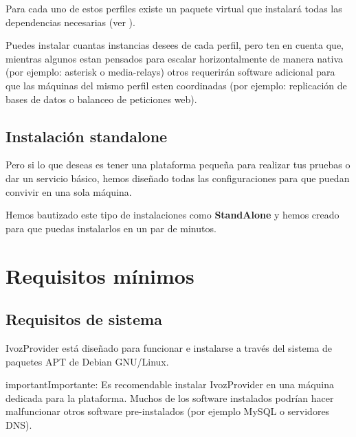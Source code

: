 \documentclass[letterpaper,10pt,spanish]{sphinxmanual}
\begin{document}
Para cada uno de estos perfiles existe un paquete virtual que instalará todas las dependencias necesarias (ver {\hyperref[installation/debian_install:installing\string-profile\string-package]{}}).

Puedes instalar cuantas instancias desees de cada perfil, pero ten en cuenta que, mientras algunos estan pensados para escalar horizontalmente de manera nativa (por ejemplo: asterisk o media-relays) otros requerirán software adicional para que las máquinas del mismo perfil esten coordinadas (por ejemplo: replicación de bases de datos o balanceo de peticiones web).


\subsection{Instalación standalone}
\label{installation/install_types:standalone-install}
Pero si lo que deseas es tener una plataforma pequeña para realizar tus pruebas o dar un servicio básico, hemos diseñado todas las configuraciones para que puedan convivir en una sola máquina.

Hemos bautizado este tipo de instalaciones como \textbf{StandAlone} y hemos  creado {\hyperref[installation/cd_install:automatic\string-iso\string-cd\string-image]{}} para que puedas instalarlos en un par de minutos.


\section{Requisitos mínimos}
\label{installation/requirements:minimum-requirements}\label{installation/requirements::doc}

\subsection{Requisitos de sistema}
\label{installation/requirements:system-requirements}
IvozProvider está diseñado para funcionar e instalarse a través del sistema de paquetes APT de Debian GNU/Linux.

\begin{notice}{important}{Importante:}
Es recomendable instalar IvozProvider en una máquina dedicada para la plataforma. Muchos de los software instalados podrían hacer malfuncionar otros software pre-instalados (por ejemplo MySQL o servidores DNS).
\end{notice}
\end{document}
